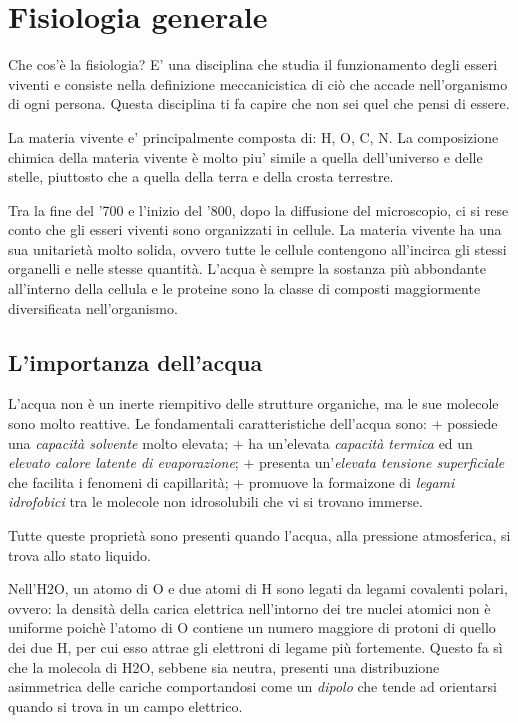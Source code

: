 \documentclass[]{article}
\begin{document}
\section{Fisiologia generale}\label{fisiologia-generale}

Che cos'è la fisiologia? E' una disciplina che studia il funzionamento
degli esseri viventi e consiste nella definizione meccanicistica di ciò
che accade nell'organismo di ogni persona. Questa disciplina ti fa
capire che non sei quel che pensi di essere.

La materia vivente e' principalmente composta di: H, O, C, N. La
composizione chimica della materia vivente è molto piu' simile a quella
dell'universo e delle stelle, piuttosto che a quella della terra e della
crosta terrestre.

Tra la fine del '700 e l'inizio del '800, dopo la diffusione del
microscopio, ci si rese conto che gli esseri viventi sono organizzati in
cellule. La materia vivente ha una sua unitarietà molto solida, ovvero
tutte le cellule contengono all'incirca gli stessi organelli e nelle
stesse quantità. L'acqua è sempre la sostanza più abbondante all'interno
della cellula e le proteine sono la classe di composti maggiormente
diversificata nell'organismo.

\subsection{L'importanza dell'acqua}\label{limportanza-dellacqua}

L'acqua non è un inerte riempitivo delle strutture organiche, ma le sue
molecole sono molto reattive. Le fondamentali caratteristiche dell'acqua
sono: + possiede una \emph{capacità solvente} molto elevata; + ha
un'elevata \emph{capacità termica} ed un \emph{elevato calore latente di
evaporazione}; + presenta un'\emph{elevata tensione superficiale} che
facilita i fenomeni di capillarità; + promuove la formaizone di
\emph{legami idrofobici} tra le molecole non idrosolubili che vi si
trovano immerse.

Tutte queste proprietà sono presenti quando l'acqua, alla pressione
atmosferica, si trova allo stato liquido.

Nell'H2O, un atomo di O e due atomi di H sono legati da legami covalenti
polari, ovvero: la densità della carica elettrica nell'intorno dei tre
nuclei atomici non è uniforme poichè l'atomo di O contiene un numero
maggiore di protoni di quello dei due H, per cui esso attrae gli
elettroni di legame più fortemente. Questo fa sì che la molecola di H2O,
sebbene sia neutra, presenti una distribuzione asimmetrica delle cariche
comportandosi come un \emph{dipolo} che tende ad orientarsi quando si
trova in un campo elettrico.
\end{document}
